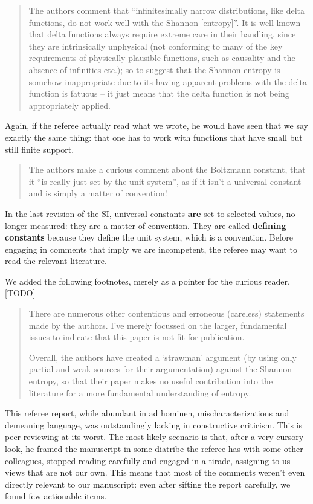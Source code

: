 \documentclass[11pt]{article}
\begin{document}
\begin{quote}
The authors comment that “infinitesimally narrow distributions, like delta functions, do not work well with the Shannon [entropy]”. It is well known that delta functions always require extreme care in their handling, since they are intrinsically unphysical (not conforming to many of the key requirements of physically plausible functions, such as causality and the absence of infinities etc.); so to suggest that the Shannon entropy is somehow inappropriate due to its having apparent problems with the delta function is fatuous – it just means that the delta function is not being appropriately applied. 
\end{quote}
Again, if the referee actually read what we wrote, he would have seen that we say exactly the same thing: that one has to work with functions that have small but still finite support.

\begin{quote}
The authors make a curious comment about the Boltzmann constant, that it “is really just set by the unit system”, as if it isn’t a universal constant and is simply a matter of convention! 
\end{quote}
In the last revision of the SI, universal constants \textbf{are} set to selected values, no longer measured: they are a matter of convention. They are called \textbf{defining constants} because they define the unit system, which is a convention. Before engaging in comments that imply we are incompetent, the referee may want to read the relevant literature.

We added the following footnotes, merely as a pointer for the curious reader. [TODO]

\begin{quote}
There are numerous other contentious and erroneous (careless) statements made by the authors. I’ve merely focussed on the larger, fundamental issues to indicate that this paper is not fit for publication. 

Overall, the authors have created a ‘strawman’ argument (by using only partial and weak sources for their argumentation) against the Shannon entropy, so that their paper makes no useful contribution into the literature for a more fundamental understanding of entropy.
\end{quote}

This referee report, while abundant in ad hominen, mischaracterizations and demeaning language, was outstandingly lacking in constructive criticism. This is peer reviewing at its worst. The most likely scenario is that, after a very cursory look, he framed the manuscript in some diatribe the referee has with some other colleagues, stopped reading carefully and engaged in a tirade, assigning to us views that are not our own. This means that most of the comments weren't even directly relevant to our manuscript: even after sifting the report carefully, we found few actionable items.
\end{document}
